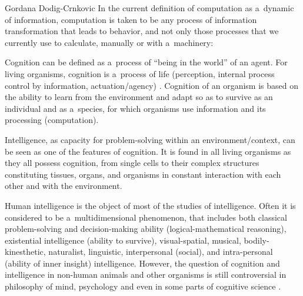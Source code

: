 \begin{artengenv}{Gordana Dodig-Crnkovic}
{}
In the current definition of computation as a~dynamic of information, computation is taken to be any process of information transformation that leads to behavior, and not only those processes that we currently use to calculate, manually or with a~machinery:

Cognition can be defined as a~process of ``being in the world'' of an agent. For living organisms, cognition is a~process of life (perception, internal process control by information, actuation/agency)
\parencites{maturana_biology_1970}{maturana_autopoiesis_1980}{stewart_cognition_1996}.
Cognition of an organism is based on the ability to learn from the environment and adapt so as to survive as an individual and as a~species, for which organisms use information and its processing (computation).

Intelligence, as capacity for problem-solving within an environment/context, can be seen as one of the features of cognition. It is found in all living organisms as they all possess cognition, from single cells to their complex structures constituting tissues, organs, and organisms in constant interaction with each other and with the environment.

Human intelligence is the object of most of the studies of intelligence. Often it is considered to be a~multidimensional phenomenon, that includes both classical problem-solving and decision-making ability (logical-mathematical reasoning), existential intelligence (ability to survive), visual-spatial, musical, bodily-kinesthetic, naturalist, linguistic, interpersonal (social), and intra-personal (ability of inner insight) intelligence. However, the question of cognition and intelligence in non-human animals and other organisms is still controversial in philosophy of mind, psychology and even in some parts of cognitive science
\parencite[][]{ball_book_2022}.%



\end{artengenv}
